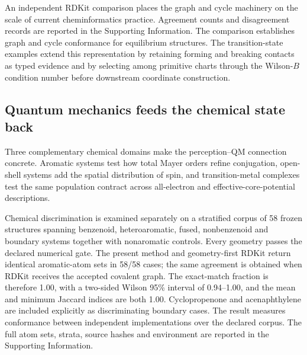 \documentclass[journal=jctcce,manuscript=article]{achemso}
\begin{document}
An independent RDKit comparison places the graph and cycle machinery on the
scale of current cheminformatics practice.
\cite{rdkit_book_2026}  Agreement counts and disagreement records are reported
in the Supporting Information.  The comparison establishes graph and cycle
conformance for equilibrium structures.  The transition-state examples extend
this representation by retaining forming and breaking contacts as typed
evidence and by selecting among primitive charts through the Wilson-$B$
condition number before downstream coordinate construction.

\subsection{Quantum mechanics feeds the chemical state back}

Three complementary chemical domains make the perception--QM connection
concrete.  Aromatic systems test how total Mayer orders refine conjugation,
open-shell systems add the spatial distribution of spin, and transition-metal
complexes test the same population contract across all-electron and
effective-core-potential descriptions.

Chemical discrimination is examined separately on a stratified corpus of 58
frozen structures spanning benzenoid, heteroaromatic, fused, nonbenzenoid and
boundary systems together with nonaromatic controls.  Every geometry passes
the declared numerical gate.  The present method and geometry-first RDKit
return identical aromatic-atom sets in 58/58 cases; the same agreement is
obtained when RDKit receives the accepted covalent graph.  The exact-match
fraction is therefore 1.00, with a two-sided Wilson 95\% interval of
0.94--1.00, and the mean and minimum Jaccard indices are both 1.00.
Cyclopropenone and acenaphthylene are included explicitly as discriminating
boundary cases.  The result measures conformance between independent
implementations over the declared corpus.  The full atom sets, strata, source
hashes and environment are reported in the Supporting Information.
\end{document}
